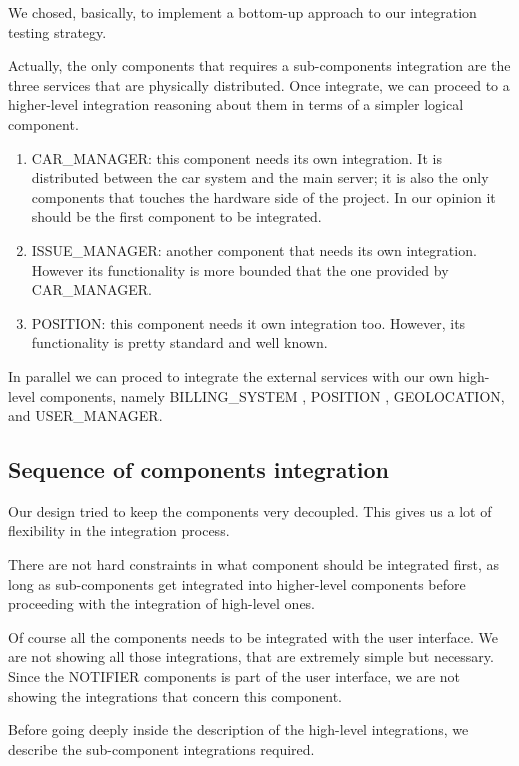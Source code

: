 \documentclass[11pt]{article} %
\begin{document}
We chosed, basically, to implement a bottom-up approach to our integration testing strategy. 

Actually, the only components that requires a sub-components integration are the three services that are physically distributed. Once integrate, we can proceed to a higher-level integration reasoning about them in terms of a simpler logical component.

\begin{enumerate}
	\item CAR\_MANAGER: this component needs its own integration. It is distributed between the car system and the main server; it is also the only components that touches the hardware side of the project. In our opinion it should be the first component to be integrated.
	\item ISSUE\_MANAGER: another component that needs its own integration. However its functionality is more bounded that the one provided by CAR\_MANAGER.
	\item POSITION: this component needs it own integration too. However, its functionality is pretty standard and well known.
\end{enumerate}

In parallel we can proced to integrate the external services with our own high-level components, namely BILLING\_SYSTEM , POSITION , GEOLOCATION,  and  USER\_MANAGER.

\subsection{Sequence of components integration}

Our design tried to keep the components very decoupled. This gives us a lot of flexibility in the integration process.

There are not hard constraints in what component should be integrated first, as long as sub-components get integrated into higher-level components before proceeding with the integration of high-level ones.

Of course all the components needs to be integrated with the user interface. We are not showing all those integrations, that are extremely simple but necessary. Since the NOTIFIER components is part of the user interface, we are not showing the integrations that concern this component.

Before going deeply inside the description of the high-level integrations, we describe the sub-component integrations required.
\end{document}
